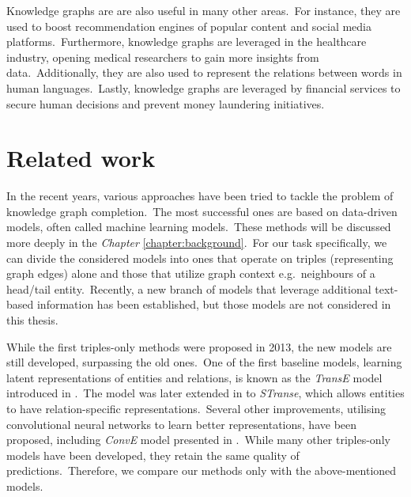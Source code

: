 \documentclass[longabstract, english, mgr]{iithesis}
\theoremstyle{default_theorem_style}\newtheorem{theorem}{Theorem}
\theoremstyle{default_theorem_style}\newtheorem{definition}{Definition}
\begin{document}
\noindent Knowledge graphs are are also useful in many other areas.\ For instance, they are used to boost
recommendation engines of popular content and social media platforms.\ Furthermore, knowledge graphs are leveraged
in the healthcare industry, opening medical researchers to gain more insights from data.\ Additionally, they are
also used to represent the relations between words in human languages.\ Lastly, knowledge graphs are leveraged by
financial services to secure human decisions and prevent money laundering initiatives.


\section{Related work}

In the recent years, various approaches have been tried to tackle the problem of knowledge graph completion.\ The most
successful ones are based on data-driven models, often called machine learning models.\ These methods will be
discussed more deeply in the \textit{Chapter} \ref{chapter:background}.\ For our task specifically, we can divide the
considered models into ones that operate on triples (representing graph edges) alone and those that utilize graph
context e.g.\ neighbours of a head/tail entity.\ Recently, a new branch of models that leverage additional text-based
information has been established, but those models are not considered in this thesis.\newline

\noindent While the first triples-only methods were proposed in 2013, the new models are still developed, surpassing
the old ones.\ One of the first baseline models, learning latent representations of entities and relations, is known
as the \textit{TransE} model introduced in \cite{transe_model}.\ The model was later extended in \cite{stranse_model}
to \textit{STranse}, which allows entities to have relation-specific representations.\ Several other
improvements, utilising convolutional neural networks to learn better representations, have been proposed,
including \textit{ConvE} model presented in \cite{conve_model}.\ While many other triples-only models have been
developed, they retain the same quality of predictions.\ Therefore, we compare our methods only with the
above-mentioned models.\newline
\end{document}
